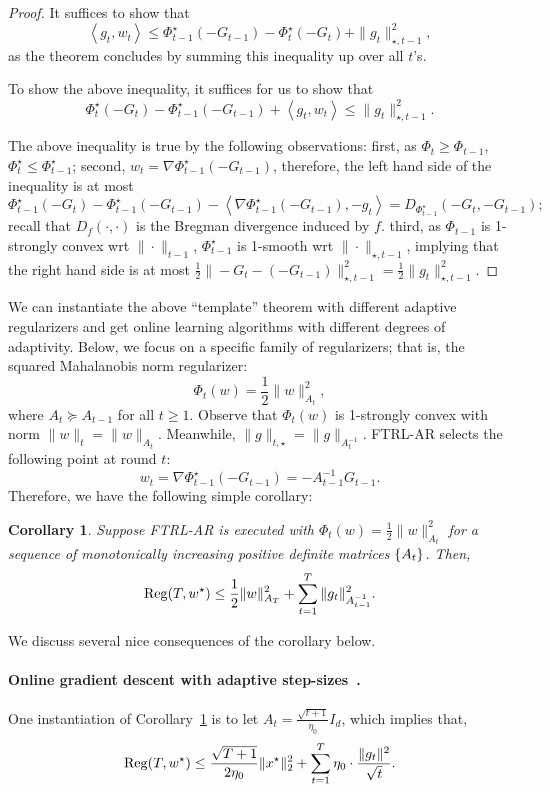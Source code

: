 \documentclass{article}
\newtheorem{corollary}{Corollary}
\DeclareMathOperator*{\Reg}{{\rm Reg}}
\DeclareMathOperator*{\argmin}{{\rm argmin}}
\newcommand{\inner}[2]{\left\langle #1,#2 \right\rangle}
\begin{document}
\begin{proof}
It suffices to show that
\[ \inner{g_t}{w_t} \leq \Phi_{t-1}^\star(-G_{t-1}) - \Phi_t^\star(-G_t) + \| g_t \|_{\star, t-1}^2, \]
as the theorem concludes by summing this inequality up over all $t$'s.

To show the above inequality, it suffices for us to show that
\[ \Phi_t^\star(-G_t) - \Phi_{t-1}^\star(-G_{t-1}) + \inner{g_t}{w_t} \leq \| g_t \|_{\star, t-1}^2. \]

The above inequality is true by the following observations: first, as $\Phi_t \geq \Phi_{t-1}$, $\Phi_t^\star \leq \Phi_{t-1}^\star$; second, $w_t = \nabla \Phi_{t-1}^\star(-G_{t-1})$, therefore,
the left hand side of the inequality is at most
\[ \Phi_{t-1}^\star(-G_t) - \Phi_{t-1}^\star(-G_{t-1}) - \inner{\nabla \Phi_{t-1}^\star(-G_{t-1})}{-g_t} = D_{\Phi_{t-1}^\star}(-G_t, -G_{t-1}); \]
recall that $D_f(\cdot, \cdot)$ is the Bregman divergence induced by $f$.
third, as $\Phi_{t-1}$ is 1-strongly convex wrt $\| \cdot \|_{t-1}$, $\Phi_{t-1}^\star$ is 1-smooth wrt $\| \cdot \|_{\star, t-1}$, implying that the right hand side is at most $\frac12 \| -G_t - (-G_{t-1}) \|_{\star, t-1}^2 = \frac12 \| g_t \|_{\star, t-1}^2$.
\end{proof}

We can instantiate the above ``template'' theorem with different adaptive regularizers and get online learning algorithms with different degrees of adaptivity. Below, we focus on a specific family of regularizers; that is, the squared Mahalanobis norm regularizer:
\[ \Phi_t(w) = \frac12 \| w \|_{A_t}^2, \]
where $A_t \succeq A_{t-1}$ for all $t \geq 1$. Observe that $\Phi_t(w)$ is 1-strongly convex with norm $\| w \|_t = \| w \|_{A_t}$. Meanwhile, $\| g \|_{t,\star} = \| g \|_{A_t^{-1}}$. FTRL-AR selects the following point at round $t$:
\[ w_t = \nabla \Phi_{t-1}^\star(-G_{t-1}) = -A_{t-1}^{-1} G_{t-1}. \]
Therefore, we have the following simple corollary:
\begin{corollary}
Suppose FTRL-AR is executed with $\Phi_t(w) = \frac12 \| w \|_{A_t}^2$ for a sequence of monotonically increasing positive definite matrices $\cbr{A_t}$. Then,
\[ \Reg(T, w^\star) \leq \frac{1}{2}\| w \|_{A_T}^2 + \sum_{t=1}^T \| g_t \|_{A_{t-1}^{-1}}^2. \]
\label{cor:ftal-ar-pd}
\end{corollary}
We discuss several nice consequences of the corollary below.


\paragraph{Online gradient descent with adaptive step-sizes~\cite{zinkevich2003online}.} One instantiation of Corollary~\ref{cor:ftal-ar-pd} is to let $A_t = \frac{\sqrt{t+1}}{\eta_0} I_d$, which implies that,
\[ \Reg(T, w^\star) \leq \frac{\sqrt{T+1}}{2\eta_0} \| x^\star \|_2^2 + \sum_{t=1}^T \eta_0 \cdot \frac{\| g_t \|^2}{\sqrt{t}}.  \]
\end{document}
